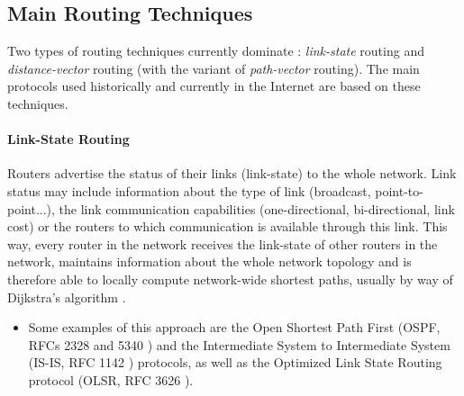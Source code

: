 


\subsection{Main Routing Techniques}
\label{ss:routing}
%
Two types of routing techniques currently dominate \cite{interconnections}: {\em link-state} routing and {\em distance-vector} routing (with the variant of {\em path-vector} routing). The main protocols used historically and currently in the Internet are based on these techniques.
%
\paragraph{Link-State Routing} Routers advertise the status of their links (link-state) to the whole network. Link status may include information about the type of link (broadcast, point-to-point...), the link communication capabilities (one-directional, bi-directional, link cost) or the routers to which communication is available through this link. This way, every router in the network receives the link-state of other routers in the network, maintains information about the whole network topology and is therefore able to locally compute network-wide shortest paths, usually by way of Dijkstra's algorithm \cite{dijkstra59}. 
	\begin{itemize}
	\item Some examples of this approach are the Open Shortest Path First (OSPF, RFCs 2328 and 5340 \cite{rfc2328,rfc5340}) and the Intermediate System to Intermediate System (IS-IS, RFC 1142 \cite{rfc1142}) protocols, as well as the Optimized Link State Routing protocol (OLSR, RFC 3626 \cite{rfc3626}).
	\end{itemize}


